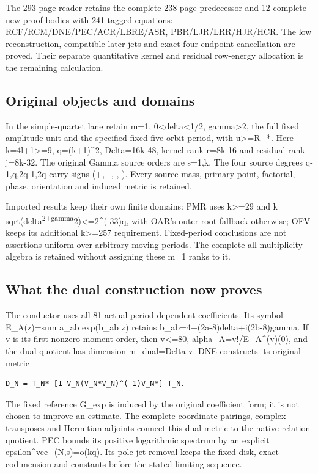 \documentclass[
]{article}
\begin{document}
The 293-page reader retains the complete 238-page predecessor and 12
complete new proof bodies with 241 tagged equations:
RCF/RCM/DNE/PEC/ACR/LBRE/ASR, PBR/LJR/LRR/HJR/HCR. The low
reconstruction, compatible later jets and exact four-endpoint
cancellation are proved. Their separate quantitative kernel and residual
row-energy allocation is the remaining calculation.

\subsection{Original objects and
domains}\label{original-objects-and-domains}

In the simple-quartet lane retain m=1, 0\textless delta\textless1/2,
gamma\textgreater2, the full fixed amplitude unit and the specified
fixed five-orbit period, with \textbar u\textbar\textgreater=R\_*. Here
k=4l+1\textgreater=9, q=(k+1)\^{}2, Delta=16k-48, kernel rank r=8k-16
and residual rank j=8k-32. The original Gamma source orders are s=1,k.
The four source degrees q-1,q,2q-1,2q carry signs (+,+,-,-). Every
source mass, primary point, factorial, phase, orientation and induced
metric is retained.

Imported results keep their own finite domains: PMR uses
k\textgreater=29 and k
sqrt(delta\textsuperscript{2+gamma}2)\textless=2\^{}(-33)q, with OAR's
outer-root fallback otherwise; OFV keeps its additional
k\textgreater=257 requirement. Fixed-period conclusions are not
assertions uniform over arbitrary moving periods. The complete
all-multiplicity algebra is retained without assigning these m=1 ranks
to it.

\subsection{What the dual construction now
proves}\label{what-the-dual-construction-now-proves}

The conductor uses all 81 actual period-dependent coefficients. Its
symbol E\_A(z)=sum a\_ab exp(b\_ab z) retains
b\_ab=4+(2a-8)delta+i(2b-8)gamma. If v is its first nonzero moment
order, then v\textless=80, alpha\_A=v!/E\_A\^{}(v)(0), and the dual
quotient has dimension m\_dual=Delta-v. DNE constructs its original
metric

\begin{verbatim}
D_N = T_N* [I-V_N(V_N*V_N)^(-1)V_N*] T_N.
\end{verbatim}

The fixed reference G\_exp is induced by the original coefficient form;
it is not chosen to improve an estimate. The complete coordinate
pairings, complex transposes and Hermitian adjoints connect this dual
metric to the native relation quotient. PEC bounds its positive
logarithmic spectrum by an explicit epsilon\^{}vee\_(N,s)=o(kq). Its
pole-jet removal keeps the fixed disk, exact codimension and constants
before the stated limiting sequence.
\end{document}
